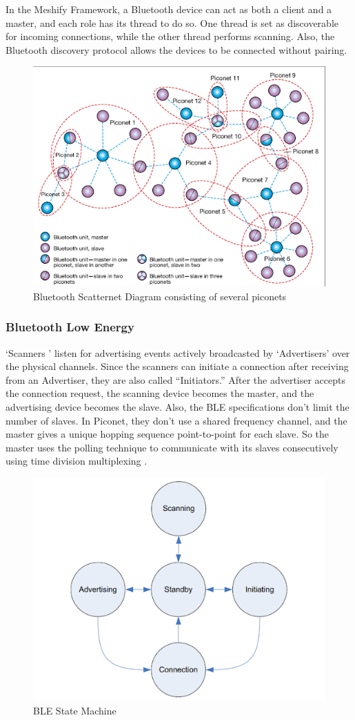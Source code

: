 In the Meshify Framework, a Bluetooth device can act as both a client and a
master, and each role has its thread to do so\cite{gunasekara2022}. One thread
is set as discoverable for incoming connections, while the other thread
performs scanning. Also, the Bluetooth discovery protocol allows the devices to
be connected without pairing.

\begin{figure}[htbp]
    \centerline{\includegraphics[height=0.45\textwidth]{imgs/piconetbl.png}}
    \caption{Bluetooth Scatternet Diagram consisting of several piconets
        \cite{Larsson2000}}
    \label{piconetbl}
\end{figure}

\subsubsection{Bluetooth Low Energy}

‘Scanners ’ listen for advertising events actively broadcasted by ‘Advertisers’
over the physical channels. Since the scanners can initiate a connection after
receiving from an Advertiser, they are also called “Initiators.” After the
advertiser accepts the connection request, the scanning device becomes the
master, and the advertising device becomes the slave. Also, the BLE
specifications don't limit the number of slaves. In Piconet, they don’t use a
shared frequency channel, and the master gives a unique hopping sequence
point-to-point for each slave. So the master uses the polling technique to
communicate with its slaves consecutively using time division multiplexing
\cite{todtenberg2019}.

\begin{figure}[htbp]
    \centerline{\includegraphics[height=0.45\textwidth]{imgs/blstatemach.png}}
    \caption{BLE State Machine}
    \label{blstatemach}
\end{figure}

